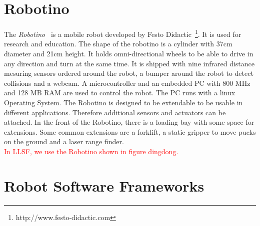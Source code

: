 \section{Robotino}
The \textit{Robotino}~\cite{Robotino} is a mobile robot developed by Festo Didactic~\footnote{http://www.festo-didactic.com}. It is used for research and education. The shape of the robotino is a cylinder with 37cm diameter and 21cm height. It holds omni-directional wheels to be able to drive in any direction and turn at the same time. It is shipped with nine infrared distance mesuring sensors ordered around the robot, a bumper around the robot to detect collisions and a webcam. A microcontroller and an embedded PC with 800 MHz and 128 MB RAM are used to control the robot. The PC runs with a linux Operating System. The Robotino is designed to be extendable to be usable in different applications. Therefore additional sensors and actuators can be attached. In the front of the Robotino, there is a loading bay with some space for extensions. Some common extensions are a forklift, a static gripper to move pucks on the ground and a laser range finder.\\
\textcolor{red}{In LLSF, we use the Robotino shown in figure dingdong.}


\section{Robot Software Frameworks}
